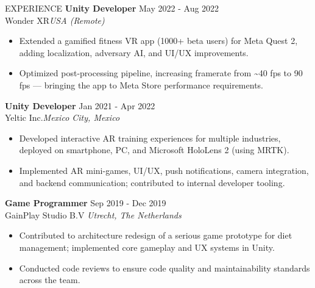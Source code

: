 \documentclass{resume} %
\begin{document}
\begin{rSection}{EXPERIENCE}
\textbf{Unity Developer} \hfill May 2022 - Aug 2022\\
Wonder XR\hfill \textit{USA (Remote)}
 \begin{itemize}
    \itemsep -3pt {} 
    \item Extended a gamified fitness VR app (1000+ beta users) for Meta Quest 2, adding localization, adversary AI, and UI/UX improvements.
    \item Optimized post-processing pipeline, increasing framerate from \textasciitilde40 fps to 90 fps — bringing the app to Meta Store performance requirements.
 \end{itemize}

\textbf{Unity Developer} \hfill Jan 2021 - Apr 2022\\
Yeltic Inc.\hfill \textit{Mexico City, Mexico}
 \begin{itemize}
    \itemsep -3pt {} 
    \item Developed interactive AR training experiences for multiple industries, deployed on smartphone, PC, and Microsoft HoloLens 2 (using MRTK).
    \item Implemented AR mini-games, UI/UX, push notifications, camera integration, and backend communication; contributed to internal developer tooling.
 \end{itemize}

\textbf{Game Programmer} \hfill Sep 2019 - Dec 2019\\
GainPlay Studio B.V \hfill \textit{Utrecht, The Netherlands}
 \begin{itemize}
    \itemsep -3pt {} 
    \item Contributed to architecture redesign of a serious game prototype for diet management; implemented core gameplay and UX systems in Unity.
    \item Conducted code reviews to ensure code quality and maintainability standards across the team.
 \end{itemize}


\end{rSection} 
\end{document}

